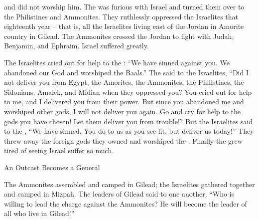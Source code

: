{{}
and did not
worship him.
The
{}
was furious
with Israel
and turned
them over
to the Philistines
and Ammonites.
They ruthlessly
oppressed
the Israelites
that eighteenth
year –
that is, all
the Israelites
living east
of the Jordan
in Amorite
country
in Gilead.
The Ammonites
crossed
the Jordan
to fight
with Judah,
Benjamin,
and Ephraim.
Israel
suffered
greatly.
\par }{\PP {}The Israelites
cried
out for help to
the {}: “We have sinned
against you. We
abandoned
our God
and worshiped
the Baals.”
The
{}
said
to
the Israelites,
“Did I not
deliver you from
Egypt,
the Amorites,
the Ammonites,
the Philistines,
the Sidonians,
Amalek,
and Midian
when they oppressed
you? You cried out
for help to
me, and I delivered
you from their power.
But
since you
abandoned
me and worshiped
other
gods,
I
will not
deliver
you again.
Go
and cry
for help to
the gods
you have
chosen! Let them
deliver
you from trouble!”
But the Israelites
said to
the {}, “We have sinned.
You do
to us as you
see
fit,
but deliver
us
today!”
They threw away
the foreign
gods
they owned
and worshiped
the {}. Finally
the
{} grew tired
of seeing
Israel
suffer
so much.
\par }{\SH An Outcast Becomes a General
\par }{\PP {}The Ammonites
assembled
and camped
in Gilead;
the Israelites
gathered together
and camped
in Mizpah.
The leaders
of Gilead
said
to
one
another,
“Who
is willing
to lead the charge against
the Ammonites? He will become
the leader
of all
who live
in Gilead!”

}
